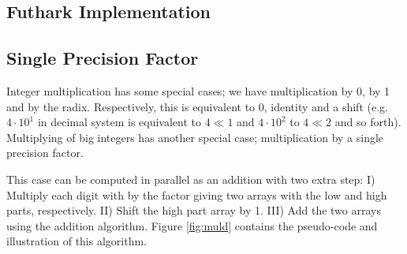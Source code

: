 \pagebreak

\subsection{Futhark Implementation}
\label{subsec:mulfut}


\subsection{Single Precision Factor}
\label{subsec:mulsin}

Integer multiplication has some special cases; we have multiplication by 0, by 1
and by the radix. Respectively, this is equivalent to 0, identity and a shift
(e.g. $4 \cdot 10^1$ in decimal system is equivalent to $4 \ll 1$ and
$4\cdot 10^2$ to $4\ll 2$ and so forth). Multiplying of big integers has another
special case; multiplication by a single precision factor.

This case can be computed in parallel as an addition with two extra step: I)
Multiply each digit with by the factor giving two arrays with the low and high
parts, respectively. II) Shift the high part array by 1. III) Add the two arrays
using the addition algorithm. Figure \ref{fig:muld} contains the pseudo-code and
illustration of this algorithm.

